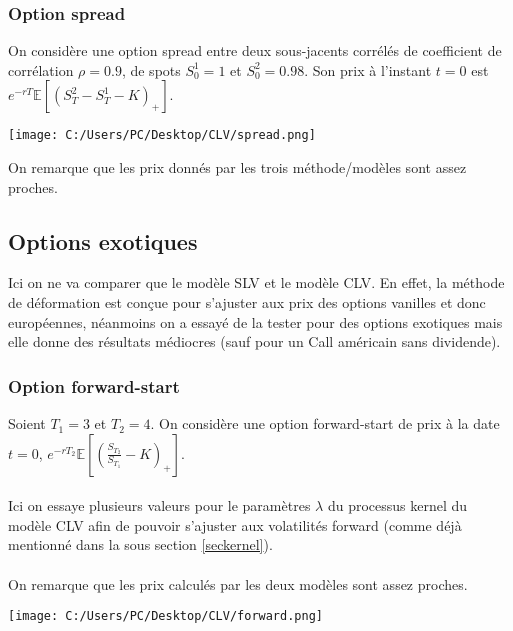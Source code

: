 \documentclass[a4paper,12pt]{report}
\numberwithin{equation}{section}
\theoremstyle{definition}
\numberwithin{equation}{section}
\begin{document}
\subsubsection{Option spread}
On considère une option spread entre deux sous-jacents corrélés de coefficient de corrélation $\rho = 0.9$, de spots $S_0^1=1$ et $S_0^2=0.98$. Son prix à l'instant $t=0$ est 
$e^{-rT}\mathbb{E}\left[ \left( S_T^2 - S_T^1 -K \right)_+\right]$. 
\begin{center}
\texttt{[image: C:/Users/PC/Desktop/CLV/spread.png]}
\end{center}
On remarque que les prix donnés par les trois méthode/modèles sont assez proches.
\subsection{Options exotiques}
Ici on ne va comparer que le modèle SLV et le modèle CLV. En effet, la méthode de déformation est conçue pour s'ajuster aux prix des options vanilles et donc européennes, néanmoins on a essayé de la tester pour des options exotiques mais elle donne des résultats médiocres (sauf pour un Call américain sans dividende).  
\subsubsection{Option forward-start}
Soient $T_1 = 3$ et $T_2 = 4$. On considère une option forward-start de prix à la date $t=0$, $e^{-rT_2}\mathbb{E}\left[  \left(\frac{S_{T_2}}{S_{T_1}}-K \right)_+ \right]$. \\\\
Ici on essaye plusieurs valeurs pour le paramètres $\lambda$ du  processus kernel du modèle CLV afin de pouvoir s'ajuster aux volatilités forward (comme déjà mentionné dans la sous section \ref{seckernel}).\\\\
On remarque que les prix calculés par les deux modèles sont assez proches.
\begin{center}
\texttt{[image: C:/Users/PC/Desktop/CLV/forward.png]}
\end{center}
\end{document}
